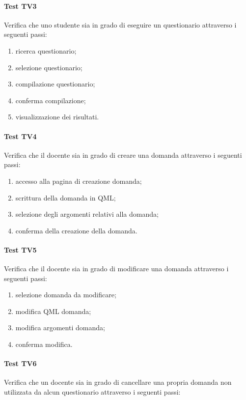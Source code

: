 \documentclass[12pt,a4paper]{article}
\begin{document}
	\paragraph{Test TV3}
	Verifica che uno studente sia in grado di eseguire un questionario attraverso i seguenti passi:
	
	\begin{enumerate}
		\item ricerca questionario;
		\item selezione questionario;
		\item compilazione questionario;
		\item conferma compilazione;
		\item visualizzazione dei risultati.
	\end{enumerate}
	\hypertarget{TV4}{}
	\paragraph{Test TV4}
	Verifica che il docente sia in grado di creare una domanda attraverso i seguenti passi:
	
	\begin{enumerate}
		\item accesso alla pagina di creazione domanda;
		\item scrittura della domanda in QML;
		\item selezione degli argomenti relativi alla domanda;
		\item conferma della creazione della domanda.
	\end{enumerate}
	\hypertarget{TV5}{}
	\paragraph{Test TV5}
	Verifica che il docente sia in grado di modificare una domanda attraverso i seguenti passi:
	
	\begin{enumerate}
		\item selezione domanda da modificare;
		\item modifica QML domanda;
		\item modifica argomenti domanda;
		\item conferma modifica.
	\end{enumerate}
	\hypertarget{TV6}{}
	\paragraph{Test TV6}
	Verifica che un docente sia in grado di cancellare una propria domanda non utilizzata da alcun questionario attraverso i seguenti passi:
	
\end{document}
